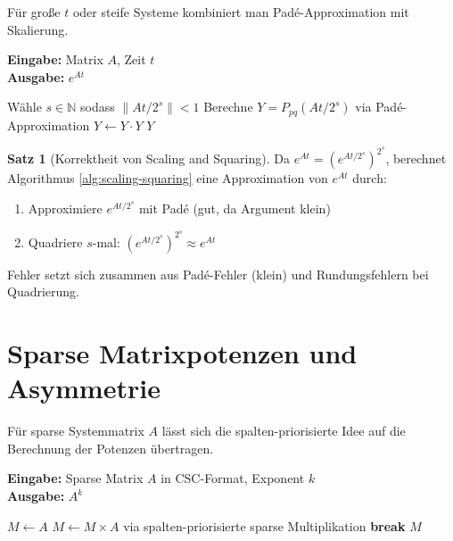 ﻿\documentclass[a4paper,12pt]{report}
\theoremstyle{definition}
\newtheorem{satz}{Satz}
\begin{document}
	Für große $t$ oder steife Systeme kombiniert man Padé-Approximation mit Skalierung.
	
	\begin{algorithm}[H]
		\caption{Scaling and Squaring für Matrixexponential}
		\label{alg:scaling-squaring}
		\textbf{Eingabe:} Matrix $A$, Zeit $t$ \\
		\textbf{Ausgabe:} $e^{At}$
		\begin{algorithmic}[1]
			\State Wähle $s \in \mathbb{N}$ sodass $\|At/2^s\| < 1$
			\State Berechne $Y = P_{pq}(At/2^s)$ via Padé-Approximation
			\State $Y \gets Y \cdot Y$ 
			\EndFor
			\State \Return $Y$
		\end{algorithmic}
	\end{algorithm}
	
	\begin{satz}[Korrektheit von Scaling and Squaring]
		Da $e^{At} = (e^{At/2^s})^{2^s}$, berechnet Algorithmus \ref{alg:scaling-squaring} eine Approximation von $e^{At}$ durch:
		\begin{enumerate}
			\item Approximiere $e^{At/2^s}$ mit Padé (gut, da Argument klein)
			\item Quadriere $s$-mal: $(e^{At/2^s})^{2^s} \approx e^{At}$
		\end{enumerate}
		
		Fehler setzt sich zusammen aus Padé-Fehler (klein) und Rundungsfehlern bei Quadrierung.
	\end{satz}
	
	\section{Sparse Matrixpotenzen und Asymmetrie}
	
	Für sparse Systemmatrix $A$ lässt sich die spalten-priorisierte Idee auf die Berechnung der Potenzen übertragen.
	
	\begin{algorithm}[H]
		\caption{Sparse Matrixpotenz-Berechnung}
		\label{alg:sparse-matrix-power}
		\textbf{Eingabe:} Sparse Matrix $A$ in CSC-Format, Exponent $k$ \\
		\textbf{Ausgabe:} $A^k$
		\begin{algorithmic}[1]
			\State $M \gets A$
			\State $M \gets M \times A$ via spalten-priorisierte sparse Multiplikation
			\State \textbf{break} 
			\EndIf
			\EndFor
			\State \Return $M$
		\end{algorithmic}
	\end{algorithm}
	
\end{document}
